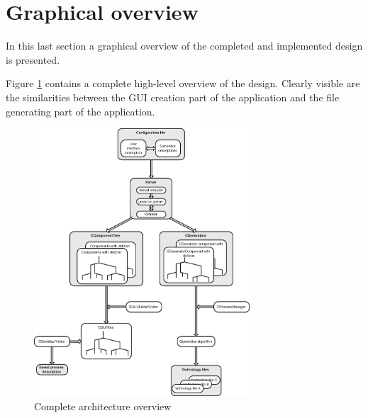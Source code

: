 %

\section{Graphical overview} \label{sect:design:conclusions}
In this last section a graphical overview of the completed and implemented
design is presented.

\bigskip \noindent
Figure \ref{fig:design:complete_overview} contains a complete high-level
overview of the design. Clearly visible are the similarities between the GUI
creation part of the application and the file generating part of the
application.

\begin{figure}[b!] \begin{center}
\includegraphics[height=10cm]{./figures/complete_overview.eps}
\caption{Complete architecture overview}
\label{fig:design:complete_overview}
\end{center} \end{figure}

